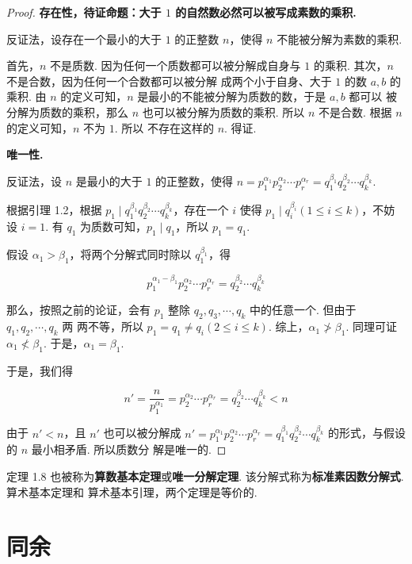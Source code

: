\documentclass[a4paper]{article}
\begin{document}
\begin{proof}
    \textbf{存在性，待证命题：大于 $1$ 的自然数必然可以被写成素数的乘积. }

    反证法，设存在一个最小的大于 $1$ 的正整数 $n$，使得 $n$ 不能被分解为素数的乘积. 

    首先，$n$ 不是质数. 因为任何一个质数都可以被分解成自身与 $1$ 的乘积. 其次，$n$ 不是合数，因为任何一个合数都可以被分解
    成两个小于自身、大于 $1$ 的数 $a,b$ 的乘积. 由 $n$ 的定义可知，$n$ 是最小的不能被分解为质数的数，于是 $a,b$ 都可以
    被分解为质数的乘积，那么 $n$ 也可以被分解为质数的乘积. 所以 $n$ 不是合数. 根据 $n$ 的定义可知，$n$ 不为 $1$. 所以
    不存在这样的 $n$. 得证. 

    \textbf{唯一性. }

    反证法，设 $n$ 是最小的大于 $1$ 的正整数，使得 $n=p_1^{\alpha_1}p_2^{\alpha_2}\cdots p_r^{\alpha_r}
    =q_1^{\beta_1}q_2^{\beta_2}\cdots q_k^{\beta_k}$. 

    根据引理 1.2，根据 $p_1\mid q_1^{\beta_1}q_2^{\beta_2}\cdots q_k^{\beta_k}$，存在一个 $i$ 使得 $p_1
    \mid q_i^{\beta_i}(1\le i\le k)$，不妨设 $i=1$. 有 $q_1$ 为质数可知，$p_1\mid q_1$，所以 $p_1=q_1$. 

    假设 $\alpha_1>\beta_1$，将两个分解式同时除以 $q_1^{\beta_1}$，得

    $$
    p_1^{\alpha_1-\beta_1}p_2^{\alpha_2}\cdots p_r^{\alpha_r}=q_2^{\beta_2}\cdots q_k^{\beta_k}
    $$

    那么，按照之前的论证，会有 $p_1$ 整除 $q_2,q_3,\cdots,q_k$ 中的任意一个. 但由于 $q_1,q_2,\cdots,q_k$ 两
    两不等，所以 $p_1=q_1\ne q_i(2\le i\le k)$. 综上，$\alpha_1\not>\beta_1$. 同理可证 $\alpha_1\not<
    \beta_1$. 于是，$\alpha_1=\beta_1$. 

    于是，我们得
    
    $$
    n'=\frac{n}{p_1^{\alpha_1}}=p_2^{\alpha_2}\cdots p_r^{\alpha_r}=q_2^{\beta_2}\cdots q_k^{\beta_k}
    <n
    $$

    由于 $n'<n$，且 $n'$ 也可以被分解成 $n'=p_1^{\alpha_1}p_2^{\alpha_2}\cdots p_r^{\alpha_r}
    =q_1^{\beta_1}q_2^{\beta_2}\cdots q_k^{\beta_k}$ 的形式，与假设的 $n$ 最小相矛盾. 所以质数分
    解是唯一的. 
\end{proof}

定理 1.8 也被称为\textbf{算数基本定理}或\textbf{唯一分解定理}. 该分解式称为\textbf{标准素因数分解式}. 算术基本定理和
算术基本引理，两个定理是等价的. 

\section{同余}
\end{document}
